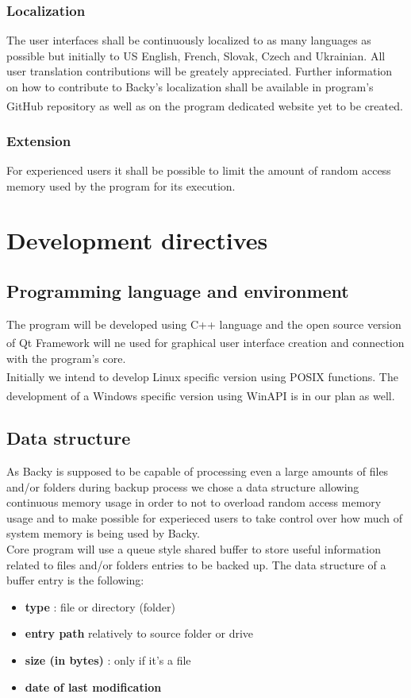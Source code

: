 \documentclass[a4paper]{article}
\begin{document}
      \subsubsection{Localization}
        The user interfaces shall be continuously localized to as many languages as possible but initially to US English, French, Slovak, Czech and Ukrainian. All user translation contributions will be greately appreciated. Further information on how to contribute to Backy's localization shall be available in program's GitHub\textsuperscript{\textregistered} repository as well as on the program dedicated website yet to be created.
      \subsubsection{Extension}
        For experienced users it shall be possible to limit the amount of random access memory used by the program for its execution.
  \section{Development directives}
    \subsection{Programming language and environment}
      The program will be developed using C++ language and the open source version of Qt\textsuperscript{\textregistered} Framework will ne used for graphical user interface creation and connection with the program's core. \\
      \indent Initially we intend to develop Linux\textsuperscript{\textregistered} specific version using POSIX functions. The development of a Windows\textsuperscript{\textregistered} specific version using WinAPI is in our plan as well.
    \subsection{Data structure}
      As Backy is supposed to be capable of processing even a large amounts of files and/or folders during backup process we chose a data structure allowing continuous memory usage in order to not to overload random access memory usage and to make possible for experieced users to take control over how much of system memory is being used by Backy. \\
      \indent Core program will use a queue style shared buffer to store useful information related to files and/or folders entries to be backed up. The data structure of a buffer entry is the following:
      \begin{itemize}
        \item \textbf{type} : file or directory (folder)
        \item \textbf{entry path} relatively to source folder or drive
        \item \textbf{size (in bytes)} : only if it's a file
        \item \textbf{date of last modification}
      \end{itemize}
\end{document}
